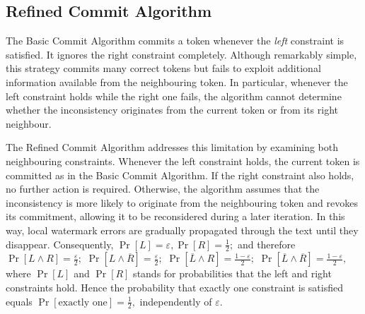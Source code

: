 \documentclass[a4paper,11pt]{llncs}
\begin{document}
\subsection{Refined Commit Algorithm}
\label{sec:refined-commit}
The Basic Commit Algorithm commits a token whenever the \emph{left}
constraint is satisfied. It ignores the right constraint completely.
Although remarkably simple, this strategy commits many correct tokens but
fails to exploit additional information available from the neighbouring
token. In particular, whenever the left constraint holds while the right
one fails, the algorithm cannot determine whether the inconsistency
originates from the current token or from its right neighbour.

The Refined Commit Algorithm addresses this limitation by examining both
neighbouring constraints. Whenever the left constraint holds, the current
token is committed as in the Basic Commit Algorithm. If the right
constraint also holds, no further action is required. Otherwise, the
algorithm assumes that the inconsistency is more likely to originate from
the neighbouring token and revokes its commitment, allowing it to be
reconsidered during a later iteration. In this way, local watermark
errors are gradually propagated through the text until they disappear.
%
Consequently,
$
\Pr[L]=\varepsilon,
\Pr[R]=\frac12; 
$
and therefore
$
\Pr[L\land R]=\frac{\varepsilon}{2};
$
$
\Pr[L\land\overline{R}]=\frac{\varepsilon}{2};
$
$
\Pr[\overline{L}\land R]=\frac{1-\varepsilon}{2};
$
$
\Pr[\overline{L}\land\overline{R}]
=\frac{1-\varepsilon}{2},
$
where $\Pr[L]$ and $\Pr[R]$ stands for probabilities that the left and right constraints hold.
Hence the probability that exactly one constraint is satisfied equals
$
\Pr[\text{exactly one}]
=
\frac12,
$
independently of $\varepsilon$.

\end{document}
